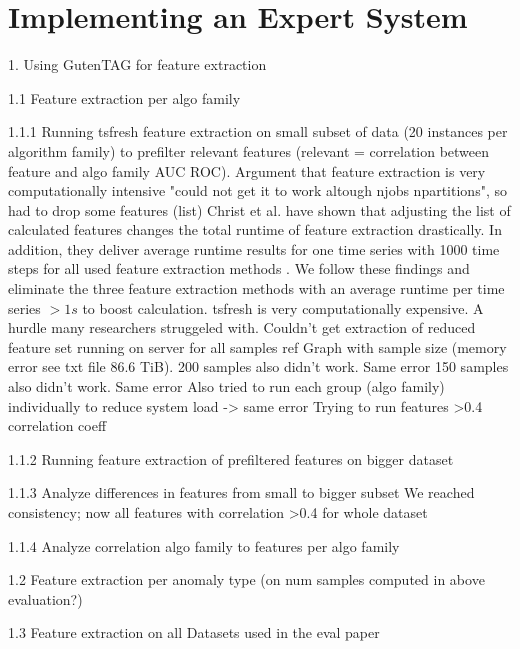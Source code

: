\chapter{Implementing an Expert System}
\label{ch:implementing_an_expert_system}
1. Using GutenTAG for feature extraction

1.1 Feature extraction per algo family

1.1.1 Running tsfresh feature extraction on small subset of data (20 instances per algorithm family) to prefilter relevant features (relevant = correlation between feature and algo family AUC ROC). Argument that feature extraction is very computationally intensive "could not get it to work altough njobs npartitions", so had to drop some features (list)
Christ et al. have shown that adjusting the list of calculated features changes the total runtime of feature extraction drastically. In addition, they deliver average runtime results for one time series with 1000 time steps for all used feature extraction methods \cite{tsfresh}. We follow these findings and eliminate the three feature extraction methods with an average runtime per time series $>1 s$ to boost calculation.
tsfresh is very computationally expensive. A hurdle many researchers struggeled with. Couldn't get extraction of reduced feature set running on server for all samples ref Graph with sample size (memory error see txt file 86.6 TiB).
200 samples also didn't work. Same error
150 samples also didn't work. Same error
Also tried to run each group (algo family) individually to reduce system load -> same error
Trying to run features >0.4 correlation coeff

1.1.2 Running feature extraction of prefiltered features on bigger dataset

1.1.3 Analyze differences in features from small to bigger subset
We reached consistency; now all features with correlation >0.4 for whole dataset

1.1.4 Analyze correlation algo family to features per algo family

1.2 Feature extraction per anomaly type (on num samples computed in above evaluation?)

1.3 Feature extraction on all Datasets used in the eval paper


